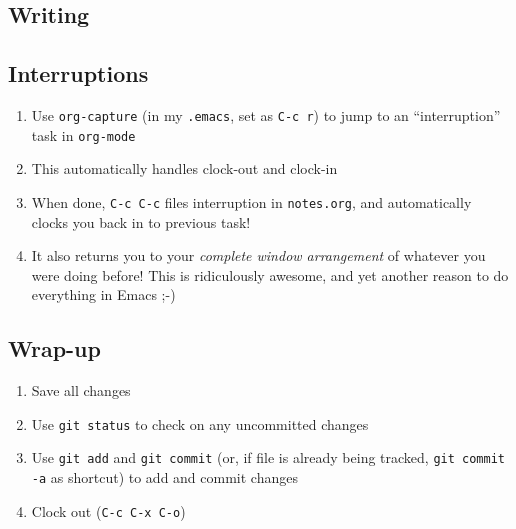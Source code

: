 \documentclass[11pt]{article}
\begin{document}
\subsection{Writing}
\label{sec-4-5}
\subsection{Interruptions}
\label{sec-4-6}

\begin{enumerate}
\item Use \texttt{org-capture} (in my \texttt{.emacs}, set as \texttt{C-c r}) to jump to an ``interruption'' task in \texttt{org-mode}
\item This automatically handles clock-out and clock-in
\item When done, \texttt{C-c C-c} files interruption in \texttt{notes.org}, and automatically clocks you back in to previous task!
\item It also returns you to your \emph{complete window arrangement} of whatever you were doing before!  This is ridiculously awesome, and yet another reason to do everything in Emacs ;-)
\end{enumerate}
\subsection{Wrap-up}
\label{sec-4-7}

\begin{enumerate}
\item Save all changes
\item Use \texttt{git status} to check on any uncommitted changes
\item Use \texttt{git add} and \texttt{git commit} (or, if file is already being tracked, \texttt{git commit -a} as shortcut) to add and commit changes
\item Clock out (\texttt{C-c C-x C-o})
\end{enumerate}
\end{document}
